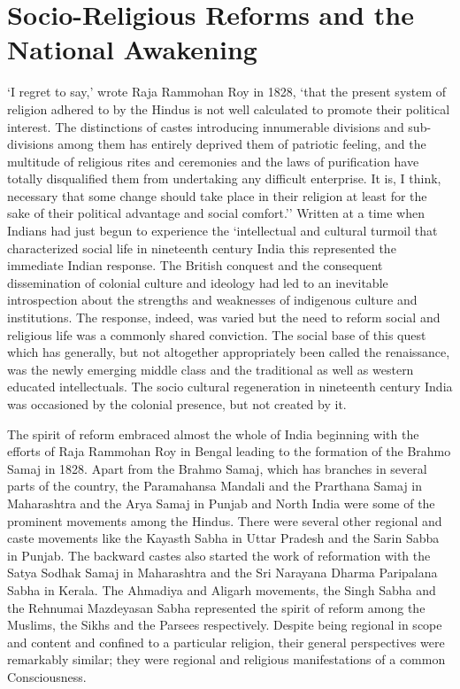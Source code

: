 \chapter{Socio-Religious Reforms and the National Awakening}

`I regret to say,' wrote Raja Rammohan Roy in 1828, `that the present system of religion adhered to by the Hindus is not well calculated to promote their political interest. The distinctions of castes introducing innumerable divisions and sub-divisions among them has entirely deprived them of patriotic feeling, and the multitude of religious rites and ceremonies and the laws of purification have totally disqualified them from undertaking any difficult enterprise. It is, I think, necessary that some change should take place in their religion at least for the sake of their political advantage and social comfort.'' Written at a time when Indians had just begun to experience the `intellectual and cultural turmoil that characterized social life in nineteenth century India this represented the immediate Indian response. The British conquest and the consequent dissemination of colonial culture and ideology had led to an inevitable introspection about the strengths and weaknesses of indigenous culture and institutions. The response, indeed, was varied but the need to reform social and religious life was a commonly shared conviction. The social base of this quest which has generally, but not altogether appropriately been called the renaissance, was the newly emerging middle class and the traditional as well as western educated intellectuals. The socio­ cultural regeneration in nineteenth century India was occasioned by the colonial presence, but not created by it.

The spirit of reform embraced almost the whole of India beginning with the efforts of Raja Rammohan Roy in Bengal leading to the formation of the Brahmo Samaj in 1828. Apart from the Brahmo Samaj, which has branches in several parts of the country, the Paramahansa Mandali and the Prarthana Samaj in Maharashtra and the Arya Samaj in Punjab and North India were some of the prominent movements among the Hindus. There were several other regional and caste movements like the Kayasth Sabha in Uttar Pradesh and the Sarin Sabba in Punjab. The backward castes also started the work of reformation with the Satya Sodhak Samaj in Maharashtra and the Sri Narayana Dharma Paripalana Sabha in Kerala. The Ahmadiya and Aligarh movements, the Singh Sabha and the Rehnumai Mazdeyasan Sabha represented the spirit of reform among the Muslims, the Sikhs and the Parsees respectively. Despite being regional in scope and content and confined to a particular religion, their general perspectives were remarkably similar; they were regional and religious manifestations of a common Consciousness.

